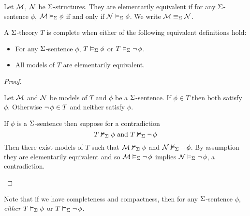 \begin{dfn}
    Let $\mathcal{M}$, $\mathcal{N}$ be $\Sigma$-structures.
    They are elementarily equivalent if for any $\Sigma$-sentence $\phi$,
    $\mathcal{M} \vDash_{\Sigma} \phi$ if and only if $\mathcal{N} \vDash_{\Sigma} \phi$.
    We write $\mathcal{M} \equiv_\Sigma \mathcal{N}$.
\end{dfn}

\begin{dfn}[Complete]
    A $\Sigma$-theory $T$ is complete when either of the following equivalent 
    definitions hold:
    \begin{itemize}
        \item For any $\Sigma$-sentence $\phi$, 
            $T \vDash_{\Sigma} \phi$ or 
            $T \vDash_{\Sigma} \neg\, \phi$.
        \item All models of $T$ are elementarily equivalent.
    \end{itemize}
\end{dfn}
\begin{proof}
    \begin{forward}
        Let $\mathcal{M}$ and $\mathcal{N}$ be models of $T$
        and $\phi$ be a $\Sigma$-sentence.
        If $\phi \in T$ then both satisfy $\phi$.
        Otherwise $\neg\, \phi \in T$ and neither satisfy $\phi$.
    \end{forward}
    
    \begin{backward}
        If $\phi$ is a $\Sigma$-sentence then suppose for a contradiction 
        \[T \nvDash_{\Sigma} \phi \text{ and } T \nvDash_{\Sigma} \neg\, \phi\]
        Then there exist models of $T$
        such that $\mathcal{M} \nvDash_{\Sigma} \phi$ and $\mathcal{N} \nvDash_{\Sigma} \neg\, \phi$.
        By assumption they are elementarily equivalent and so 
        $\mathcal{M} \vDash_{\Sigma} \neg\, \phi$ implies $\mathcal{N} \vDash_{\Sigma} \neg\, \phi$,
        a contradiction.
    \end{backward}
\end{proof}
Note that if we have completeness and compactness,
then for any $\Sigma$-sentence $\phi$,
\emph{either} $T \vDash_{\Sigma} \phi$ or 
$T \vDash_{\Sigma} \neg\, \phi$.

